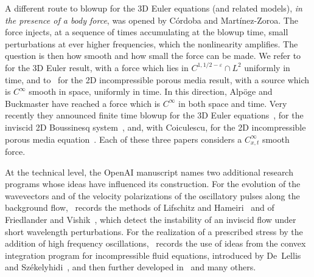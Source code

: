 \documentclass[11pt,reqno]{amsproc}
\numberwithin{equation}{section}
\theoremstyle{remark}
\newcommand{\eps}{\varepsilon}
\begin{document}
A different route to blowup for the 3D Euler equations (and related models), \emph{in the presence of a body force}, was opened by C\'ordoba and Mart\'inez-Zoroa. The force injects, at a sequence of times accumulating at the blowup time, small perturbations at ever higher frequencies, which the nonlinearity amplifies. The question is then how smooth and how small the force can be made. We refer to~\cite{CordobaMartinezZoroa23} for the 3D Euler result, with a force which lies in $C^{1,1/2-\eps}\cap L^2$ uniformly in time, and to~\cite{CordobaMartinezZoroa24} for the 2D incompressible porous media result, with a source which is $C^\infty$ smooth in space, uniformly in time. In this direction, Alp\"oge and Buckmaster have reached a force which is $C^\infty$ in both space and time. Very recently they announced finite time blowup for the 3D Euler equations~\cite{AlpogeBuckmasterEuler26}, for the inviscid 2D Boussinesq system~\cite{AlpogeBuckmasterBoussinesq26}, and, with Coiculescu, for the 2D incompressible porous media equation~\cite{AlpogeBuckmasterCoiculescu26}. Each of these three papers considers a $C^\infty_{x,t}$ smooth force.

At the technical level, the OpenAI manuscript names two additional research programs whose ideas have influenced its construction. For the evolution of the wavevectors and of the velocity polarizations of the oscillatory pulses along the background flow,~\cite{OpenAIManuscript} records the methods of Lifschitz and Hameiri~\cite{LifschitzHameiri91} and of Friedlander and Vishik~\cite{FriedlanderVishik91}, which detect the instability of an inviscid flow under short wavelength perturbations. For the realization of a prescribed stress by the addition of high frequency oscillations,~\cite{OpenAIManuscript} 
records the use of ideas from the convex integration program for incompressible fluid equations, introduced by De~Lellis and Sz\'ekelyhidi~\cite{DeLellisSzekelyhidi09,DeLellisSzekelyhidi13}, and then further developed in~\cite{DaneriSzekelyhidi17,Isett18,BuckmasterVicol19} and many others.  
\end{document}

